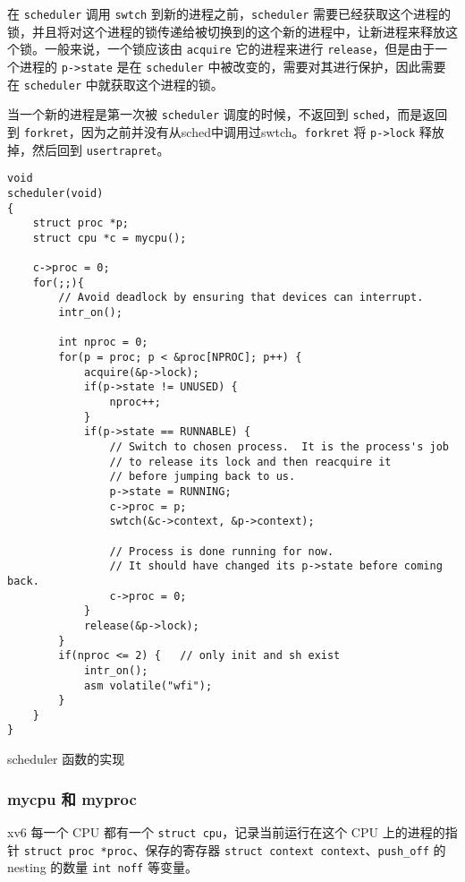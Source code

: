 在 \texttt{scheduler} 调用 \texttt{swtch} 到新的进程之前，\texttt{scheduler} 需要已经获取这个进程的锁，并且将对这个进程的锁传递给被切换到的这个新的进程中，让新进程来释放这个锁。一般来说，一个锁应该由 \texttt{acquire} 它的进程来进行 \texttt{release}，但是由于一个进程的 \texttt{p->state} 是在 \texttt{scheduler} 中被改变的，需要对其进行保护，因此需要在 \texttt{scheduler} 中就获取这个进程的锁。

当一个新的进程是第一次被 \texttt{scheduler} 调度的时候，不返回到 \texttt{sched}，而是返回到 \texttt{forkret}，因为之前并没有从sched中调用过swtch。\texttt{forkret} 将 \texttt{p->lock} 释放掉，然后回到 \texttt{usertrapret}。

\begin{listing}[!htb]
	\begin{verbatim}
void
scheduler(void)
{
    struct proc *p;
    struct cpu *c = mycpu();

    c->proc = 0;
    for(;;){
        // Avoid deadlock by ensuring that devices can interrupt.
        intr_on();

        int nproc = 0;
        for(p = proc; p < &proc[NPROC]; p++) {
            acquire(&p->lock);
            if(p->state != UNUSED) {
                nproc++;
            }
            if(p->state == RUNNABLE) {
                // Switch to chosen process.  It is the process's job
                // to release its lock and then reacquire it
                // before jumping back to us.
                p->state = RUNNING;
                c->proc = p;
                swtch(&c->context, &p->context);
                
                // Process is done running for now.
                // It should have changed its p->state before coming back.
                c->proc = 0;
            }
            release(&p->lock);
        }
        if(nproc <= 2) {   // only init and sh exist
            intr_on();
            asm volatile("wfi");
        }
    }
}
	\end{verbatim}
	\caption{scheduler 函数的实现}\label{lst:scheduler}
\end{listing}

\subsubsection{mycpu 和 myproc}

xv6 每一个 CPU 都有一个 \texttt{struct cpu}，记录当前运行在这个 CPU 上的进程的指针 \texttt{struct proc *proc}、保存的寄存器 \texttt{struct context context}、\texttt{push\_off} 的 nesting 的数量 \texttt{int noff} 等变量。


